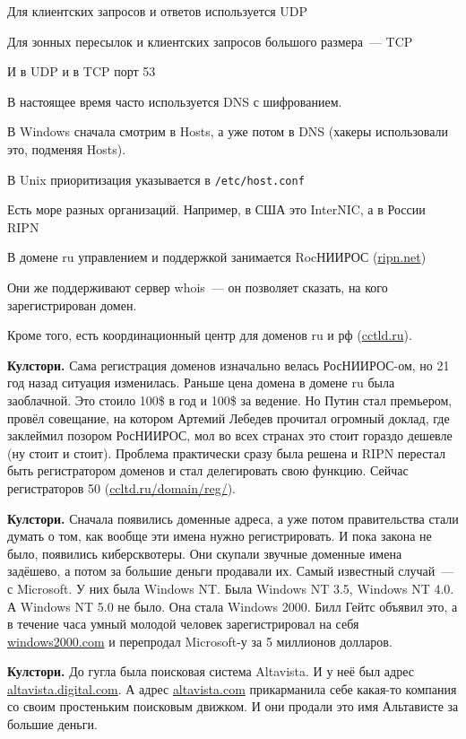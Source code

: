 
Для клиентских запросов и ответов используется UDP

Для зонных пересылок и клиентских запросов большого размера~--- TCP

И в UDP и в TCP порт 53

В настоящее время часто используется DNS с шифрованием.


В Windows сначала смотрим в Hosts, а уже потом в DNS (хакеры использовали это, подменяя Hosts).

В Unix приоритизация указывается в {\tt /etc/host.conf}


Есть море разных организаций. Например, в США это InterNIC, а в России RIPN

В домене ru управлением и поддержкой занимается RocНИИРОС (\url{ripn.net})

Они же поддерживают сервер whois~--- он позволяет сказать, на кого зарегистрирован домен.

Кроме того, есть координационный центр для доменов ru и рф (\url{cctld.ru}).

{\bf Кулстори.} Сама регистрация доменов изначально велась РосНИИРОС-ом, но 21 год назад ситуация изменилась. Раньше цена домена в домене ru была заоблачной. Это стоило 100\$ в год и 100\$ за ведение. Но Путин стал премьером, провёл совещание, на котором Артемий Лебедев прочитал огромный доклад, где заклеймил позором РосНИИРОС, мол во всех странах это стоит гораздо дешевле (ну стоит и стоит). Проблема практически сразу была решена и RIPN перестал быть регистратором доменов и стал делегировать свою функцию. Сейчас регистраторов 50 (\url{ccltd.ru/domain/reg/}).

{\bf Кулстори.} Сначала появились доменные адреса, а уже потом правительства стали думать о том, как вообще эти имена нужно регистрировать. И пока закона не было, появились киберсквотеры. Они скупали звучные доменные имена задёшево, а потом за большие деньги продавали их. Самый известный случай~--- с Microsoft. У них была Windows NT. Была Windows NT 3.5, Windows NT 4.0. А Windows NT 5.0 не было. Она стала Windows 2000. Билл Гейтс объявил это, а в течение часа умный молодой человек зарегистрировал на себя \url{windows2000.com} и перепродал Microsoft-у за 5 миллионов долларов.

{\bf Кулстори.} До гугла была поисковая система Altavista. И у неё был адрес \url{altavista.digital.com}. А адрес \url{altavista.com} прикарманила себе какая-то компания со своим простеньким поисковым движком. И они продали это имя Альтависте за большие деньги. 

